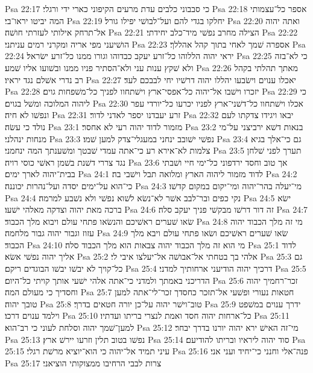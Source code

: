 Psa 22:17  כי סבבוני כלבים עדת מרעים הקיפוני כארי ידי ורגלי׃
Psa 22:18  אספר כל־עצמותי המה יביטו יראו־בי׃
Psa 22:19  יחלקו בגדי להם ועל־לבושׁי יפילו גורל׃
Psa 22:20  ואתה יהוה אל־תרחק אילותי לעזרתי חושׁה׃
Psa 22:21  הצילה מחרב נפשׁי מיד־כלב יחידתי׃
Psa 22:22  הושׁיעני מפי אריה ומקרני רמים עניתני׃
Psa 22:23  אספרה שׁמך לאחי בתוך קהל אהללך׃
Psa 22:24  יראי יהוה הללוהו כל־זרע יעקב כבדוהו וגורו ממנו כל־זרע ישׂראל׃
Psa 22:25  כי לא־בזה ולא שׁקץ ענות עני ולא־הסתיר פניו ממנו ובשׁועו אליו שׁמע׃
Psa 22:26  מאתך תהלתי בקהל רב נדרי אשׁלם נגד יראיו׃
Psa 22:27  יאכלו ענוים וישׂבעו יהללו יהוה דרשׁיו יחי לבבכם לעד׃
Psa 22:28  יזכרו וישׁבו אל־יהוה כל־אפסי־ארץ וישׁתחוו לפניך כל־משׁפחות גוים׃
Psa 22:29  כי ליהוה המלוכה ומשׁל בגוים׃
Psa 22:30  אכלו וישׁתחוו כל־דשׁני־ארץ לפניו יכרעו כל־יורדי עפר ונפשׁו לא חיה׃
Psa 22:31  זרע יעבדנו יספר לאדני לדור׃
Psa 22:32  יבאו ויגידו צדקתו לעם נולד כי עשׂה׃
Psa 23:1  מזמור לדוד יהוה רעי לא אחסר׃
Psa 23:2  בנאות דשׁא ירביצני על־מי מנחות ינהלני׃
Psa 23:3  נפשׁי ישׁובב ינחני במעגלי־צדק למען שׁמו׃
Psa 23:4  גם כי־אלך בגיא צלמות לא־אירא רע כי־אתה עמדי שׁבטך ומשׁענתך המה ינחמני׃
Psa 23:5  תערך לפני שׁלחן נגד צררי דשׁנת בשׁמן ראשׁי כוסי רויה׃
Psa 23:6  אך טוב וחסד ירדפוני כל־ימי חיי ושׁבתי בבית־יהוה לארך ימים׃
Psa 24:1  לדוד מזמור ליהוה הארץ ומלואה תבל וישׁבי בה׃
Psa 24:2  כי־הוא על־ימים יסדה ועל־נהרות יכוננה׃
Psa 24:3  מי־יעלה בהר־יהוה ומי־יקום במקום קדשׁו׃
Psa 24:4  נקי כפים ובר־לבב אשׁר לא־נשׂא לשׁוא נפשׁי ולא נשׁבע למרמה׃
Psa 24:5  ישׂא ברכה מאת יהוה וצדקה מאלהי ישׁעו׃
Psa 24:6  זה דור דרשׁו מבקשׁי פניך יעקב סלה׃
Psa 24:7  שׂאו שׁערים ראשׁיכם והנשׂאו פתחי עולם ויבוא מלך הכבוד׃
Psa 24:8  מי זה מלך הכבוד יהוה עזוז וגבור יהוה גבור מלחמה׃
Psa 24:9  שׂאו שׁערים ראשׁיכם ושׂאו פתחי עולם ויבא מלך הכבוד׃
Psa 24:10  מי הוא זה מלך הכבוד יהוה צבאות הוא מלך הכבוד סלה׃
Psa 25:1  לדוד אליך יהוה נפשׁי אשׂא׃
Psa 25:2  אלהי בך בטחתי אל־אבושׁה אל־יעלצו איבי לי׃
Psa 25:3  גם כל־קויך לא יבשׁו יבשׁו הבוגדים ריקם׃
Psa 25:4  דרכיך יהוה הודיעני ארחותיך למדני׃
Psa 25:5  הדריכני באמתך ולמדני כי־אתה אלהי ישׁעי אותך קויתי כל־היום׃
Psa 25:6  זכר־רחמיך יהוה וחסדיך כי מעולם המה׃
Psa 25:7  חטאות נעורי ופשׁעי אל־תזכר כחסדך זכר־לי־אתה למען טובך יהוה׃
Psa 25:8  טוב־וישׁר יהוה על־כן יורה חטאים בדרך׃
Psa 25:9  ידרך ענוים במשׁפט וילמד ענוים דרכו׃
Psa 25:10  כל־ארחות יהוה חסד ואמת לנצרי בריתו ועדתיו׃
Psa 25:11  למען־שׁמך יהוה וסלחת לעוני כי רב־הוא׃
Psa 25:12  מי־זה האישׁ ירא יהוה יורנו בדרך יבחר׃
Psa 25:13  נפשׁו בטוב תלין וזרעו יירשׁ ארץ׃
Psa 25:14  סוד יהוה ליראיו ובריתו להודיעם׃
Psa 25:15  עיני תמיד אל־יהוה כי הוא־יוציא מרשׁת רגלי׃
Psa 25:16  פנה־אלי וחנני כי־יחיד ועני אני׃
Psa 25:17  צרות לבבי הרחיבו ממצוקותי הוציאני׃
